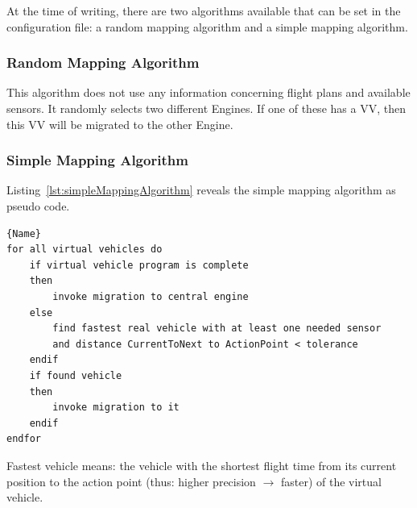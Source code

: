 At the time of writing, there are two algorithms available that can be set in the configuration file: a random
mapping algorithm and a simple mapping algorithm.

\subsubsection{Random Mapping Algorithm}
This algorithm does not use any information concerning flight plans and available sensors.
It randomly selects two different Engines. If one of these has a \ac{VV}, then this \ac{VV} will be
migrated to the other Engine.

\subsubsection{Simple Mapping Algorithm}


Listing~\ref{lst:simpleMappingAlgorithm} reveals the simple mapping algorithm as pseudo code. 

\lstset{tabsize=3,language=PseudoCode}
\begin{lstlisting}[caption={Simple Mapping Algorithm},mathescape=true,label=lst:simpleMappingAlgorithm]{Name}
for all virtual vehicles do
	if virtual vehicle program is complete
	then
		invoke migration to central engine
	else
		find fastest real vehicle with at least one needed sensor
		and distance CurrentToNext to ActionPoint < tolerance
	endif
	if found vehicle 
	then 
		invoke migration to it 
	endif
endfor
\end{lstlisting}

Fastest vehicle means: the vehicle with the shortest flight time from its current position to the action point (thus: higher precision \begin{math} \rightarrow \end{math} faster)
of the virtual vehicle. 


